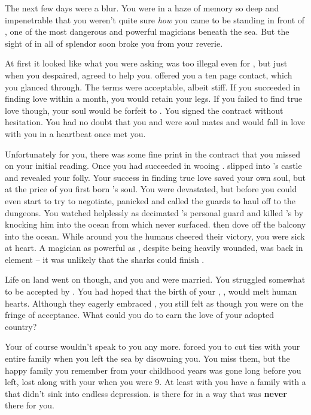 \documentclass[char]{NeptuneBall}
\begin{document}
The next few days were a blur. You were in a haze of memory so deep and impenetrable that you weren't quite sure \emph{how} you came to be standing in front of \cWitch{}, one of the most dangerous and powerful magicians beneath the sea. But the sight of \cWitch{\them} in all of \cWitch{\their} splendor soon broke you from your reverie.

At first it looked like what you were asking was too illegal even for \cWitch{}, but just when you despaired, \cWitch{\they} agreed to help you. \cWitch{} offered you a ten page contact, which you glanced through. The terms were acceptable, albeit stiff. If you succeeded in finding love within a month, you would retain your legs. If you failed to find true love though, your soul would be forfeit to \cWitch{}. You signed the contract without hesitation. You had no doubt that you and \cEric{} were soul mates and \cEric{\they} would fall in love with you in a heartbeat once \cEric{} met you.

Unfortunately for you, there was some fine print in the contract that you missed on your initial reading. Once you had succeeded in wooing \cEric{}. \cWitch{} slipped into \cEric{}'s castle and revealed your folly. Your success in finding true love saved your own soul, but at the price of you first born \cArielsSon{\offspring}'s soul. You were devastated, but before you could even start to try to negotiate, \cEric{} panicked and called the guards to haul \cWitch{} off to the dungeons. You watched helplessly as \cWitch{} decimated \cEric{}'s personal guard and killed \cEric{}'s \cPrince{\sibling} \cSlave{} by knocking him into the ocean from which \cSlave{\they} never surfaced. \cWitch{} then dove off the balcony into the ocean. While around you the humans cheered their victory, you were sick at heart. A magician as powerful as \cWitch{}, despite being heavily wounded, was back in \cWitch{\them} element -- it was unlikely that the sharks could finish \cWitch{\them}.

Life on land went on though, and you and \cEric{} were married. You struggled somewhat to be accepted by \pAmerica{}. You had hoped that the birth of your \cWillow{\offspring}, \cWillow{}, would melt human hearts. Although they eagerly embraced \cWillow{}, you still felt as though you were on the fringe of acceptance. What could you do to earn the love of your adopted country? 

Your \cKing{\parent} of course wouldn't speak to you any more. \cKing{\They} forced you to cut ties with your entire family when you left the sea by disowning you. You miss them, but the happy family you remember from your childhood years was gone long before you left, lost along with your \cAthena{\parent} when you were 9. At least with \cEric{} you have a family with a \cEric{\parent} that didn't sink into endless depression. \cEric{} is there for \cWillow{} in a way that \cKing{} was {\bf never} there for you.
\end{document}
